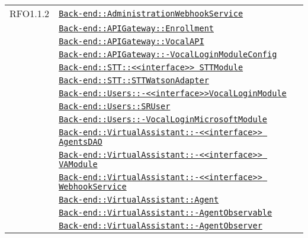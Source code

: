 \begin{longtable}{|>{\centering}m{3cm}|m{10cm}<{\centering}|}
RFO1.1.2 & \hyperref[Back-end::AdministrationWebhookService]{\texttt{Back-end::AdministrationWebhookService}}\\
& \hyperref[Back-end::APIGateway::Enrollment]{\texttt{Back-end::APIGateway::Enrollment}}\\
& \hyperref[Back-end::APIGateway::VocalAPI]{\texttt{Back-end::APIGateway::VocalAPI}}\\
& \hyperref[Back-end::APIGateway::VocalLoginModuleConfig]{\texttt{Back-end::APIGateway::-\linebreak VocalLoginModuleConfig}}\\
& \hyperref[Back-end::STT::<<interface>> STTModule]{\texttt{Back-end::STT::<<interface>> STTModule}}\\
& \hyperref[Back-end::STT::STTWatsonAdapter]{\texttt{Back-end::STT::STTWatsonAdapter}}\\
& \hyperref[Back-end::Users::<<interface>>VocalLoginModule]{\texttt{Back-end::Users::-\linebreak <<interface>>VocalLoginModule}}\\
& \hyperref[Back-end::Users::SRUser]{\texttt{Back-end::Users::SRUser}}\\
& \hyperref[Back-end::Users::VocalLoginMicrosoftModule]{\texttt{Back-end::Users::-\linebreak VocalLoginMicrosoftModule}}\\
& \hyperref[Back-end::VirtualAssistant::<<interface>> AgentsDAO]{\texttt{Back-end::VirtualAssistant::-\linebreak <<interface>> AgentsDAO}}\\
& \hyperref[Back-end::VirtualAssistant::<<interface>> VAModule]{\texttt{Back-end::VirtualAssistant::-\linebreak <<interface>> VAModule}}\\
& \hyperref[Back-end::VirtualAssistant::<<interface>> WebhookService]{\texttt{Back-end::VirtualAssistant::-\linebreak <<interface>> WebhookService}}\\
& \hyperref[Back-end::VirtualAssistant::Agent]{\texttt{Back-end::VirtualAssistant::Agent}}\\
& \hyperref[Back-end::VirtualAssistant::AgentObservable]{\texttt{Back-end::VirtualAssistant::-\linebreak AgentObservable}}\\
& \hyperref[Back-end::VirtualAssistant::AgentObserver]{\texttt{Back-end::VirtualAssistant::-\linebreak AgentObserver}}\\

\end{longtable}
